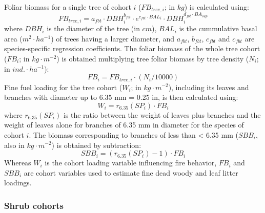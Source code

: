 \documentclass[]{book}
\begin{document}
Foliar biomass for a single tree of cohort \(i\) (\(FB_{tree,i}\); in \(kg\)) is calculated using:
\begin{equation}
FB_{tree,i} = a_{fbt} \cdot DBH_{i}^{b_{fbt}}\cdot e^{c_{fbt}\cdot BAL_i} \cdot DBH_{i}^{d_{fbt} \cdot BA_{sup}}
\end{equation}
where \(DBH_{i}\) is the diameter of the tree (in \(cm\)), \(BAL_i\) is the cummulative basal area (\(m^2\cdot ha^{-1}\)) of trees having a larger diameter, and \(a_{fbt}\), \(b_{fbt}\), \(c_{fbt}\) and \(c_{fbt}\) are species-specific regression coefficients. The foliar biomass of the whole tree cohort (\(FB_{i}\); in \(kg\cdot m^{-2}\)) is obtained multiplying tree foliar biomass by tree density (\(N_{i}\); in \(ind.\cdot ha^{-1}\)):
\begin{equation}
FB_{i} = FB_{tree,i}\cdot (N_{i}/10000)
\end{equation}
Fine fuel loading for the tree cohort (\(W_{i}\); in \(kg\cdot m^{-2}\)), including its leaves and branches with diameter up to 6.35 mm = 0.25 in, is then calculated using:
\begin{equation}
W_{i} = r_{6.35}(SP_i)\cdot FB_{i}
\end{equation}
where \(r_{6.35}(SP_i)\) is the ratio between the weight of leaves plus branches and the weight of leaves alone for branches of 6.35 mm in diameter for the species of cohort \(i\). The biomass corresponding to branches of less than \textless{} 6.35 mm (\(SBB_{i}\), also in \(kg\cdot m^{-2}\)) is obtained by subtraction:
\begin{equation}
SBB_{i} = (r_{6.35}(SP_i)-1)\cdot FB_{i}
\end{equation}
Whereas \(W_{i}\) is the cohort loading variable influencing fire behavior, \(FB_{i}\) and \(SBB_{i}\) are cohort variables used to estimate fine dead woody and leaf litter loadings.

\hypertarget{shrub-cohorts}{%
\subsubsection{Shrub cohorts}\label{shrub-cohorts}}
\end{document}

